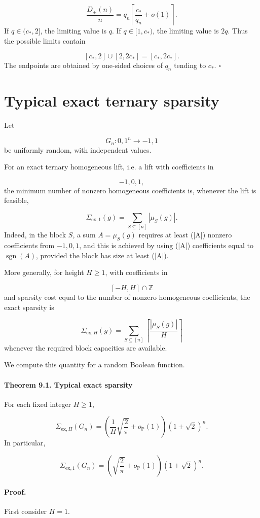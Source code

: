 \documentclass[11pt]{article}
\theoremstyle{definition}
\begin{document}
\[
\frac{D_\pm(n)}n
=
q_n
\left\lceil
\frac{c_*}{q_n}+o(1)
\right\rceil.
\]
If $q\in(c_*,2]$, the limiting value is $q$. If $q\in[1,c_*)$, the limiting value is $2q$. Thus the possible limits contain

\[
[c_*,2]\cup[2,2c_*]=[c_*,2c_*].
\]
The endpoints are obtained by one-sided choices of $q_n$ tending to $c_*$. $\square$

\section{Typical exact ternary sparsity}
Let

\[
G_n:{0,1}^n\to{-1,1}
\]
be uniformly random, with independent values.

For an exact ternary homogeneous lift, i.e. a lift with coefficients in

\[
{-1,0,1},
\]
the minimum number of nonzero homogeneous coefficients is, whenever the lift is feasible,

\[
\Sigma_{\mathrm{ex},1}(g)
=
\sum_{S\subseteq[n]}|\mu_S(g)|.
\]
Indeed, in the block $S$, a sum $A=\mu_S(g)$ requires at least (|A|) nonzero coefficients from ${-1,0,1}$, and this is achieved by using (|A|) coefficients equal to $\operatorname{sgn}(A)$, provided the block has size at least (|A|).

More generally, for height $H\ge1$, with coefficients in

\[
[-H,H]\cap\mathbb{Z}
\]
and sparsity cost equal to the number of nonzero homogeneous coefficients, the exact sparsity is

\[
\Sigma_{\mathrm{ex},H}(g)
=
\sum_{S\subseteq[n]}
\left\lceil
\frac{|\mu_S(g)|}{H}
\right\rceil
\]
whenever the required block capacities are available.

We compute this quantity for a random Boolean function.

\paragraph{Theorem 9.1. Typical exact sparsity}
For each fixed integer $H\ge1$,

\[
\Sigma_{\mathrm{ex},H}(G_n)
=
\left(
\frac1H\sqrt{\frac2\pi}
+
o_{\mathbb{P}}(1)
\right)
(1+\sqrt2)^n.
\]
In particular,

\[
\Sigma_{\mathrm{ex},1}(G_n)
=
\left(
\sqrt{\frac2\pi}
+
o_{\mathbb{P}}(1)
\right)
(1+\sqrt2)^n.
\]
\paragraph{Proof.}
First consider $H=1$.
\end{document}
